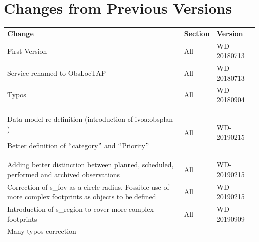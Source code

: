 \documentclass[11pt,a4paper]{ivoa}
\begin{document}
\appendix
\section{Changes from Previous Versions}


\begin{table}[H]
 			\centering
\begin{tabular}{p{3.75in}p{0.92in}p{0.8in}}
\hline
\multicolumn{1}{|p{3.75in}}{\textbf{Change}} &
\multicolumn{1}{|p{0.72in}}{\textbf{Section}} &
\multicolumn{1}{|p{0.9in}|}{\textbf{Version}} \\
\multicolumn{1}{|p{3.75in}}{First Version} &
\multicolumn{1}{|p{0.72in}}{All} &
\multicolumn{1}{|p{0.9in}|}{{\fontsize{10pt}{12.0pt}\selectfont WD-20180713}} \\
\multicolumn{1}{|p{3.75in}}{Service renamed to ObsLocTAP} &
\multicolumn{1}{|p{0.72in}}{All} &
\multicolumn{1}{|p{0.9in}|}{{\fontsize{10pt}{12.0pt}\selectfont WD-20180713}} \\
\multicolumn{1}{|p{3.75in}}{Typos} &
\multicolumn{1}{|p{0.72in}}{All} &
\multicolumn{1}{|p{0.9in}|}{{\fontsize{10pt}{12.0pt}\selectfont WD-20180904}} \\
\multicolumn{1}{|p{3.75in}}{Data model re-definition (introduction of ivoa:obsplan ) \par Better definition of $``$category$"$  and $``$Priority$"$ } &
\multicolumn{1}{|p{0.72in}}{All} &
\multicolumn{1}{|p{0.9in}|}{{\fontsize{10pt}{12.0pt}\selectfont WD-20190215}} \\
\multicolumn{1}{|p{3.75in}}{Adding better distinction between planned, scheduled, performed and archived observations} &
\multicolumn{1}{|p{0.72in}}{All} &
\multicolumn{1}{|p{0.9in}|}{{\fontsize{10pt}{12.0pt}\selectfont WD-20190215}} \\
\multicolumn{1}{|p{3.75in}}{Correction of s\_fov as a circle radius. Possible use of more complex footprints as objects to be defined} &
\multicolumn{1}{|p{0.72in}}{All} &
\multicolumn{1}{|p{0.9in}|}{{\fontsize{10pt}{12.0pt}\selectfont WD-20190215}} \\
\multicolumn{1}{|p{3.75in}}{Introduction of s\_region to cover more complex footprints} &
\multicolumn{1}{|p{0.72in}}{All} &
\multicolumn{1}{|p{0.9in}|}{{\fontsize{10pt}{12.0pt}\selectfont WD-20190909}} \\
\multicolumn{1}{|p{3.75in}}{Many typos correction} &

\end{tabular}
\end{table}
\end{document}

